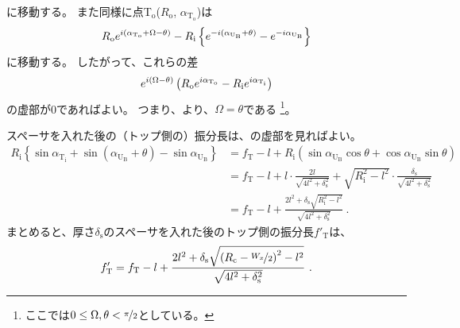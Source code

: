 に移動する。
また同様に点T$_\mathrm o$($R_\mathrm o$, $\alpha_{\mathrm T_\mathrm o}$)は
\begin{align*}
  \notag
  R_\mathrm oe^{i(\alpha_{\mathrm T_\mathrm o} + \Omega - \theta)}
  -R_\mathrm i\left\{e^{-i(\alpha_{\mathrm U_\mathrm B} + \theta)}-e^{-i\alpha_{\mathrm U_\mathrm B}}\right\}
\end{align*}
に移動する。
したがって、これらの差
\begin{align*}
  \notag
  e^{i(\Omega - \theta)}\left(R_\mathrm oe^{i\alpha_{\mathrm T_\mathrm o}} - R_\mathrm ie^{i\alpha_{\mathrm T_\mathrm i}}\right)
\end{align*}
の虚部が0であればよい。
つまり、より、$\Omega = \theta$である
\footnote{ここでは$0 \leq \Omega, \theta < \nicefrac \pi2$としている。}。

スペーサを入れた後の（トップ側の）振分長は、の虚部を見ればよい。
\begin{align*}
  R_\mathrm i\left\{\sin\alpha_{\mathrm T_\mathrm i} + \sin(\alpha_{\mathrm U_\mathrm B} + \theta) - \sin\alpha_{\mathrm U_\mathrm B}\right\}
  &= f_\mathrm T -l
     +R_\mathrm i\left(\sin\alpha_{\mathrm U_\mathrm B}\cos\theta + \cos\alpha_{\mathrm U_\mathrm B}\sin\theta\right)\\
  &= f_\mathrm T -l+l\cdot\frac{2l}{\sqrt{4l^2+\delta_\mathrm s^2}}
     +\sqrt{R_\mathrm i^2-l^2}\cdot\frac{\delta_\mathrm s}{\sqrt{4l^2+\delta_\mathrm s^2}}\\
  &= f_\mathrm T -l+\frac{2l^2+\delta_\mathrm s\sqrt{R_\mathrm i^2-l^2}}{\sqrt{4l^2+\delta_\mathrm s^2}}~.
\end{align*}
まとめると、厚さ$\delta_\mathrm s$のスペーサを入れた後のトップ側の振分長$f'_\mathrm T$は、
\begin{align*}
  f'_\mathrm T
  = f_\mathrm T -l
    +\frac{2l^2+\delta_\mathrm s\sqrt{\left(R_\mathrm c-\nicefrac{W_x}2\right)^2-l^2}}{\sqrt{4l^2+\delta_\mathrm s^2}}~.
\end{align*}



